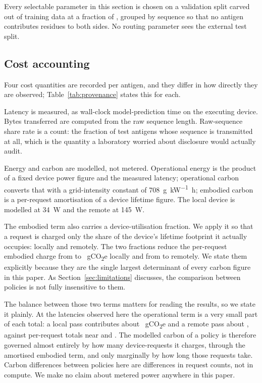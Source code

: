Every selectable parameter in this section is chosen on a validation split
carved out of training data at a fraction of \ValidationFraction{}, grouped by
sequence so that no antigen contributes residues to both sides. No routing
parameter sees the external test split.

\subsection{Cost accounting}
\label{sec:cost-accounting}

Four cost quantities are recorded per antigen, and they differ in how directly
they are observed; Table~\ref{tab:provenance} states this for each.

Latency is measured, as wall-clock model-prediction time on the executing
device. Bytes transferred are computed from the raw sequence length. Raw-sequence
share rate is a count: the fraction of test antigens whose sequence is
transmitted at all, which is the quantity a laboratory worried about disclosure
would actually audit.

Energy and carbon are modelled, not metered. Operational energy is the product
of a fixed device power figure and the measured latency; operational carbon
converts that with a grid-intensity constant of
\SI{708}{\gram\per\kilo\watt\hour}; embodied carbon is a per-request
amortisation of a device lifetime figure. The local device is modelled at
\SI{34}{\watt} and the remote at \SI{145}{\watt}.

The embodied term also carries a device-utilisation fraction. We apply it
so that a request is charged only the share of the device's lifetime footprint
it actually occupies: \CarbonLocalFraction{} locally and \CarbonEdgeFraction{}
remotely. The two fractions reduce the per-request embodied charge from
\EmbodiedDeclaredLocal{} to \EmbodiedEffectiveLocal{}~gCO\textsubscript{2}e
locally and from \EmbodiedDeclaredEdge{} to \EmbodiedEffectiveEdge{} remotely.
We state them explicitly because they are the single largest determinant of
every carbon figure in this paper. As Section~\ref{sec:limitations}
discusses, the comparison between policies is not fully insensitive to them.

The balance between those two terms matters for reading the results, so we
state it plainly. At the latencies observed here the operational term is a
very small part of each total: a local pass contributes about
\OperationalLocal{}~gCO\textsubscript{2}e and a remote pass about
\OperationalEdge{}, against
per-request totals near \LocalOnlyCarbon{} and \EdgeOnlyCarbon{}. The modelled
carbon of a policy is therefore governed almost entirely by how many
device-requests it charges, through the amortised embodied term, and only
marginally by how long those requests take. Carbon differences between
policies here are differences in request counts, not in compute. We make no
claim about metered power anywhere in this paper.

